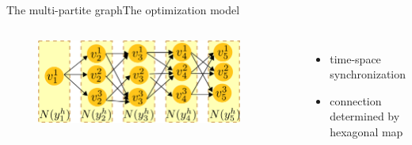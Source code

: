 \begin{frame}{The multi-partite graph}{The optimization model}

\begin{columns}

\begin{minipage}[c]{\textwidth}
\begin{figure}
\centering
\includegraphics[width = 0.9\textwidth]{./figure/MultiPartite}
\end{figure}
\end{minipage}

\begin{minipage}[c]{\textwidth}
\begin{itemize}
\item time-space synchronization
\item connection determined by hexagonal map
\end{itemize}
\end{minipage}

\end{columns}

\end{frame}

